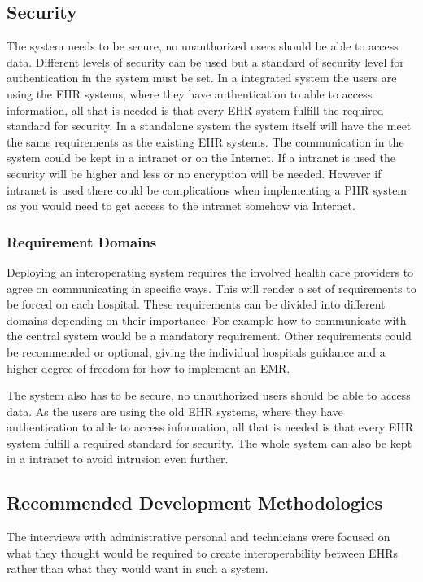 \documentclass[14pt]{article}
\begin{document}
\subsection{Security}
The system needs to be secure, no unauthorized users should be able to access data. Different levels of security can be used but a standard of security level for authentication in the system must be set. In a integrated system the users are using the \gls{EHR} systems, where they have authentication to able to access information, all that is needed is that every EHR system fulfill the required standard for security. In a standalone system the system itself will have the meet the same requirements as the existing \gls{EHR} systems. 
The communication in the system could be kept in a intranet or on the Internet. If a intranet is used the security will be higher and less or no encryption will be needed. However if intranet is used there could be complications when implementing a \gls{PHR} system as you would need to get access to the intranet somehow via Internet.

\subsubsection{Requirement Domains}
Deploying an interoperating system requires the involved health care providers to agree on communicating in specific ways. This will render a set of requirements to be forced on each hospital. These requirements can be divided into different domains depending on their importance. For example how to communicate with the central system would be a mandatory requirement. Other requirements could be recommended or optional, giving the individual hospitals guidance and a higher degree of freedom for how to implement an \gls{EMR}.

The system also has to be secure, no unauthorized users should be able to access data. As the users are using the old \gls{EHR} systems, where they have authentication to able to access information, all that is needed is that every \gls{EHR} system fulfill a required standard for security. The whole system can also be kept in a intranet to avoid intrusion even further.

\subsection{Recommended Development Methodologies}
The interviews with administrative personal and technicians were focused on what they thought would be required to create interoperability between \glspl{EHR} rather than what they would want in such a system. 
\end{document}
